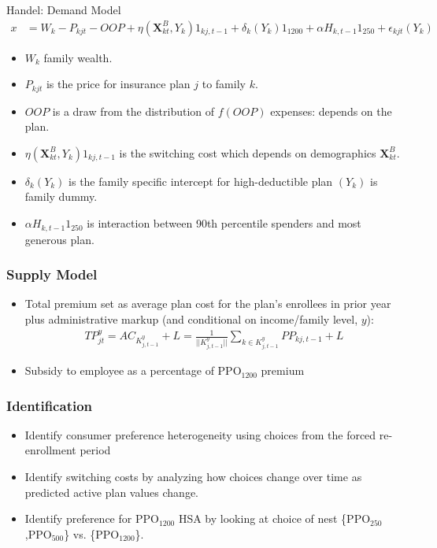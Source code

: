\begin{frame}{Handel: Demand Model}
\begin{align*}
x &=W_{k}-P_{k j t}-O O P+\eta\left(\symbf{X}_{k t}^{B}, Y_{k}\right) 1_{k j, t-1}+\delta_{k}\left(Y_{k}\right) 1_{1200}+\alpha H_{k, t-1} 1_{250}+\epsilon_{k j t}\left(Y_{k}\right)
\end{align*}
\begin{itemize}
\item $W_k$ family wealth.
\item $P_{k j t}$ is the price for insurance plan $j$ to family $k$.
\item $OOP$ is a draw from the distribution of $f(OOP)$ expenses: depends on the plan.
\item $\eta\left(\symbf{X}_{k t}^{B}, Y_{k}\right) 1_{k j, t-1}$ is the switching cost which depends on demographics $\symbf{X}_{k t}^{B}$.
\item $\delta_{k}(Y_k)$ is the family specific intercept for high-deductible plan $(Y_k)$ is family dummy.
\item $\alpha H_{k, t-1} 1_{250}$ is interaction between 90th percentile spenders and most generous plan.
\end{itemize}
\end{frame}

\begin{frame}
\frametitle{Supply Model}



\begin{itemize}
\item Total premium set as average plan cost for the plan's enrollees in
prior year plus administrative markup (and conditional on income/family
level, $y$):%
\begin{align*}
TP_{jt}^{y}=AC_{K_{j,t-1}^{y}}+L=\frac{1}{||K_{j,t-1}^{y}||}\sum_{k\in
K_{j,t-1}^{y}}PP_{kj,t-1}+L
\end{align*}
\item Subsidy to employee as a percentage of PPO$_{1200}$ premium
\end{itemize}
\end{frame}

\begin{frame}
\frametitle{Identification}

\begin{itemize}
\item Identify consumer preference heterogeneity using choices from the
forced re-enrollment period

\item Identify switching costs by analyzing how choices change over time as
predicted active plan values change.

\item Identify preference for PPO$_{1200}$ HSA by looking at choice of nest
\{PPO$_{250}$,PPO$_{500}$\} vs. \{PPO$_{1200}$\}.
\end{itemize}
\end{frame}

